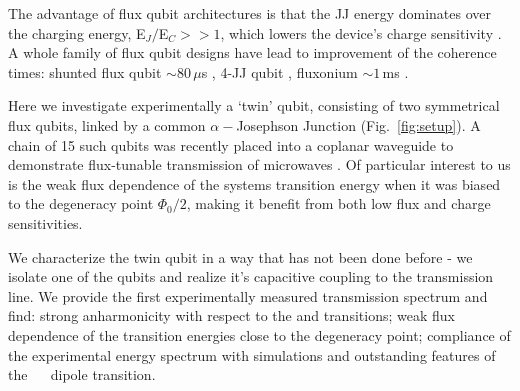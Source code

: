 The advantage of  flux qubit architectures is that  the JJ energy  dominates over the  charging energy,
E$_J/$E$_C     >>     1$,     which     lowers     the     device's     charge     sensitivity
\cite{orlando1999,chiorescu2003,mooij1999}.  A whole family of flux qubit designs have lead to
improvement of the  coherence times: shunted flux qubit $\sim80\,\mu$s  \cite{yan2016} , 4-JJ qubit
\cite{qui2016}, fluxonium $\sim1\,$ms \cite{pop2014}.

Here we investigate experimentally a `twin'  qubit, consisting of two symmetrical flux qubits,
linked by a common $ \alpha-$Josephson Junction  (Fig.~\ref{fig:setup}).  A chain of 15 such qubits
was recently  placed into  a coplanar  waveguide to  demonstrate flux-tunable  transmission of
microwaves \cite{shulga2018}.  Of particular interest to us is the weak flux dependence of the
systems transition  energy when  it was  biased to the  degeneracy point  $\Phi_0/2 $,  making it
benefit from both low flux and charge sensitivities.
 
We  characterize the twin  qubit in  a way that  has not been  done before  - we
isolate one of  the qubits and realize  it's capacitive coupling to the  transmission line. We
provide the first experimentally measured transmission spectrum and find: strong anharmonicity
with respect  to the  \ilra{} and  \ilra{} transitions;  weak flux
dependence  of the  transition  energies close  to  the degeneracy  point;  compliance of  the
experimental   energy   spectrum   with   simulations  and   outstanding   features   of   the
~\ilra~ dipole transition.


